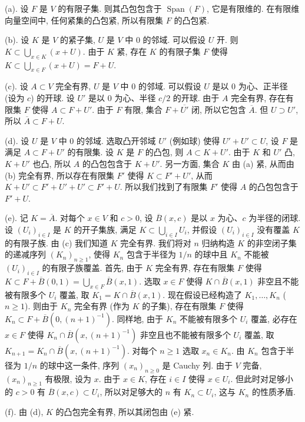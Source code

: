 \begin{solution}
(a). 设 $F$ 是 $V$ 的有限子集. 则其凸包包含于 $\operatorname{Span}(F)$, 它是有限维的. 在有限维向量空间中, 任何紧集的凸包紧, 所以有限集 $F$ 的凸包紧.

(b). 设 $K$ 是 $V$ 的紧子集, $U$ 是 $V$ 中 $0$ 的邻域. 可以假设 $U$ 开. 则 $K \subset \bigcup_{x \in K}(x + U)$. 由于 $K$ 紧, 存在 $K$ 的有限子集 $F$ 使得 $K \subset \bigcup_{x \in F}(x + U) = F + U$.

(c). 设 $A \subset V$ 完全有界, $U$ 是 $V$ 中 $0$ 的邻域. 可以假设 $U$ 是以 $0$ 为心、正半径 (设为 $c$) 的开球. 设 $U'$ 是以 $0$ 为心、半径 $c/2$ 的开球. 由于 $A$ 完全有界, 存在有限集 $F$ 使得 $A \subset F + U'$. 由于 $F$ 有限, 集合 $F + \overline{U'}$ 闭, 所以它包含 $\overline{A}$. 但 $U \supset U'$, 所以 $\overline{A} \subset F + U$.

(d). 设 $U$ 是 $V$ 中 $0$ 的邻域. 选取凸开邻域 $U'$ (例如球) 使得 $U' + U' \subset U$, 设 $F$ 是满足 $A \subset F + U'$ 的有限集. 设 $K$ 是 $F$ 的凸包, 则 $A \subset K + U'$. 由于 $K$ 和 $U'$ 凸, $K + U'$ 也凸, 所以 $A$ 的凸包包含于 $K + U'$. 另一方面, 集合 $K$ 由 (a) 紧, 从而由 (b) 完全有界, 所以存在有限集 $F'$ 使得 $K \subset F' + U'$, 从而 $K + U' \subset F' + U' + U' \subset F' + U$. 所以我们找到了有限集 $F'$ 使得 $A$ 的凸包包含于 $F' + U$.

(e). 记 $K = \overline{A}$. 对每个 $x \in V$ 和 $c > 0$, 设 $\overline{B}(x, c)$ 是以 $x$ 为心、$c$ 为半径的闭球.
设 $(U_i)_{i \in I}$ 是 $K$ 的开子集族, 满足 $K \subset \bigcup_{i \in I}U_i$, 并假设 $(U_i)_{i \in I}$ 没有覆盖 $K$ 的有限子族. 由 (c) 我们知道 $K$ 完全有界. 我们将对 $n$ 归纳构造 $K$ 的非空闭子集的递减序列 $(K_n)_{n \geq 1}$, 使得 $K_n$ 包含于半径为 $1/n$ 的球中且 $K_n$ 不能被 $(U_i)_{i \in I}$ 的有限子族覆盖.
首先, 由于 $K$ 完全有界, 存在有限集 $F$ 使得 $K \subset F + \overline{B}(0, 1) = \bigcup_{x \in F}\overline{B}(x, 1)$. 选取 $x \in F$ 使得 $K \cap \overline{B}(x, 1)$ 非空且不能被有限多个 $U_i$ 覆盖, 取 $K_1 = K \cap \overline{B}(x, 1)$.
现在假设已经构造了 $K_1, \ldots, K_n$ ($n \geq 1$). 则由于 $K_n$ 完全有界 (作为 $K$ 的子集), 存在有限集 $F$ 使得 $K_n \subset F + \overline{B}(0, (n+1)^{-1})$. 同样地, 由于 $K_n$ 不能被有限多个 $U_i$ 覆盖, 必存在 $x \in F$ 使得 $K_n \cap \overline{B}(x, (n+1)^{-1})$ 非空且也不能被有限多个 $U_i$ 覆盖, 取 $K_{n+1} = K_n \cap \overline{B}(x, (n+1)^{-1})$.
对每个 $n \geq 1$ 选取 $x_n \in K_n$. 由 $K_n$ 包含于半径为 $1/n$ 的球中这一条件, 序列 $(x_n)_{n \geq 0}$ 是 Cauchy 列. 由于 $V$ 完备, $(x_n)_{n \geq 1}$ 有极限, 设为 $x$. 由于 $x \in K$, 存在 $i \in I$ 使得 $x \in U_i$. 但此时对足够小的 $c > 0$ 有 $\overline{B}(x, c) \subset U_i$, 所以对足够大的 $n$ 有 $K_n \subset U_i$, 这与 $K_n$ 的性质矛盾.

(f). 由 (d), $K$ 的凸包完全有界, 所以其闭包由 (e) 紧.
\end{solution}

